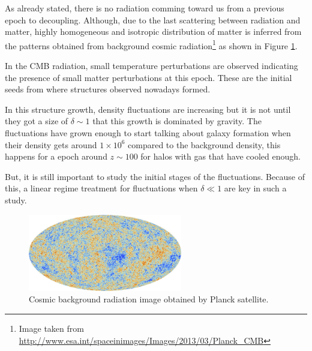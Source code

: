 As already stated, there is no radiation comming toward us from a previous 
epoch to decoupling. Although, due to the last scattering between radiation
and matter, highly homogeneous and isotropic distribution of matter is
inferred from the patterns obtained from background cosmic radiation\footnote{
Image taken from \url{http://www.esa.int/spaceinimages/Images/2013/03/Planck_CMB}} 
as shown in Figure \ref{CMB}.

In the CMB radiation, small temperature perturbations are observed indicating 
the presence of small matter perturbations at this epoch. These are the initial 
seeds from where structures observed nowadays formed. 


In this structure growth, density fluctuations are increasing but it is not
until they got a size of $\delta\sim 1$ that this growth is dominated by gravity. 
The fluctuations have grown enough to start talking 
about galaxy formation when their density gets around $1\times 10^6$ compared to
the background density, this happens for a epoch around $z\sim 100$ for halos with gas 
that have cooled enough.

But, it is still important to study the initial stages of the fluctuations.
Because of this, a linear regime treatment for fluctuations when $\delta\ll 1$
are key in such a study. 

\begin{figure}[htbp]
       \centering
               \includegraphics[width=0.6\textwidth]{Images/chapter2/Planck.jpg}
       \caption{\small Cosmic background radiation image obtained by Planck satellite.}
       \label{CMB}
 \end{figure}


